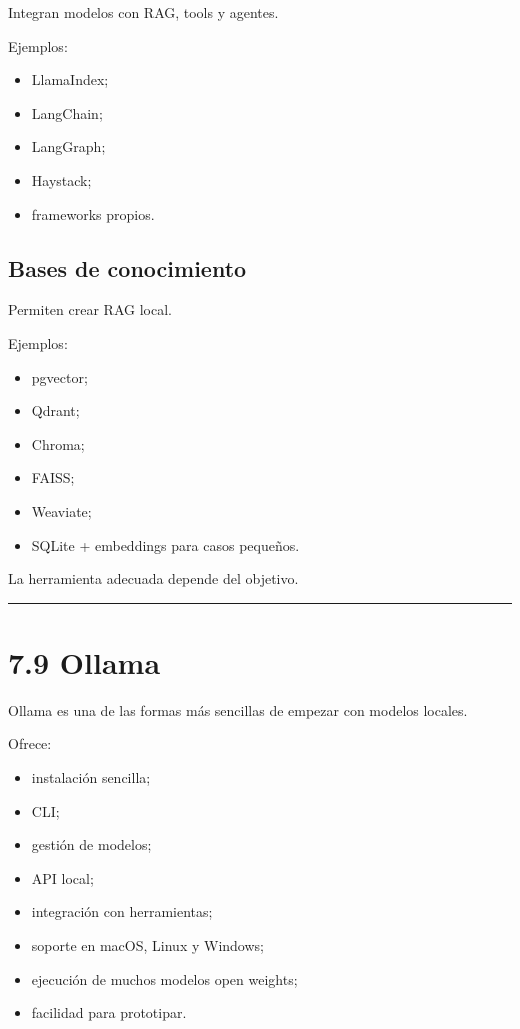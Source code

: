 Integran modelos con RAG, tools y agentes.

Ejemplos:

\begin{itemize}
\tightlist
\item
  LlamaIndex;
\item
  LangChain;
\item
  LangGraph;
\item
  Haystack;
\item
  frameworks propios.
\end{itemize}

\subsection{Bases de conocimiento}\label{bases-de-conocimiento}

Permiten crear RAG local.

Ejemplos:

\begin{itemize}
\tightlist
\item
  pgvector;
\item
  Qdrant;
\item
  Chroma;
\item
  FAISS;
\item
  Weaviate;
\item
  SQLite + embeddings para casos pequeños.
\end{itemize}

La herramienta adecuada depende del objetivo.

\begin{center}\rule{0.5\linewidth}{0.5pt}\end{center}

\section{7.9 Ollama}\label{ollama}

Ollama es una de las formas más sencillas de empezar con modelos
locales.

Ofrece:

\begin{itemize}
\tightlist
\item
  instalación sencilla;
\item
  CLI;
\item
  gestión de modelos;
\item
  API local;
\item
  integración con herramientas;
\item
  soporte en macOS, Linux y Windows;
\item
  ejecución de muchos modelos open weights;
\item
  facilidad para prototipar.
\end{itemize}

